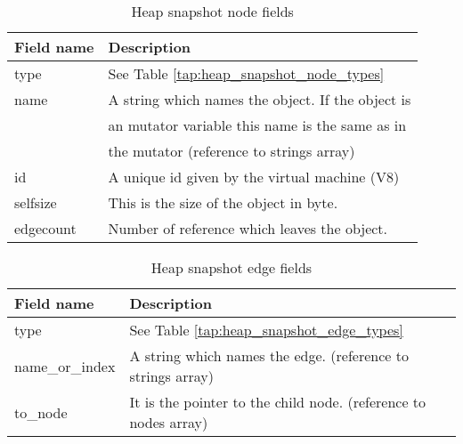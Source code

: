 \begin{table}[!htbp]
	\centering
	\begin{tabular}{|l||l|}
		\hline
		\textbf{Field name}	& \textbf{Description} 				\\ \hline \hline
		type & See Table \ref{tap:heap_snapshot_node_types}			\\ \hline
		name & A string which names the object. If the object is	\\
			 & an mutator variable this name is the same as in 		\\
			 & the mutator (reference to strings array)				\\ \hline	
		id	 & A unique id given by the virtual machine (V8)		\\ \hline
		selfsize  & This is the size of the object in byte. 		\\ \hline
		edgecount &	Number of reference which leaves the object.	\\ \hline	
	\end{tabular}
	\caption{Heap snapshot node fields}
	\label{tap:heap_snapshot_node_fields}
\end{table}
		
\begin{table}[!htbp]
	\centering
	\begin{tabular}{|l||l|}
		\hline
		\textbf{Field name}	&	\textbf{Description}			\\ \hline \hline
		type & See Table \ref{tap:heap_snapshot_edge_types}		\\ \hline
		name\_or\_index & A string which names the edge. 
							(reference to strings array)		\\	\hline
		to\_node		& It is the pointer to the child node. 
							(reference to nodes array)			\\	\hline 
	\end{tabular}
	\caption{Heap snapshot edge fields}
	\label{tap:heap_snapshot_edge_fields}
\end{table}
		

